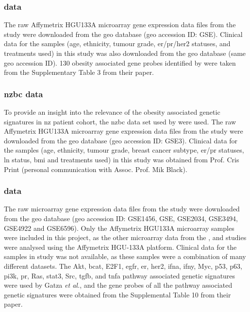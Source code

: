 \subsubsection{\citet{Fuentes-Mattei2014} data}
\label{ssub:fuentes-mattei2014_data}

The raw Affymetrix HGU\-133A microarray gene expression data files from the  \citet{Fuentes-Mattei2014} study were downloaded from the \gls{geo} database (\gls{geo} accession ID: GSE).
Clinical data for the samples (age, ethnicity, tumour grade, \gls{er}/\gls{pr}/\gls{her2} statuses, and treatments used) in this study was also downloaded from the \gls{geo} database (same \gls{geo} accession ID).
130 obesity associated gene probes identified by \citet{Fuentes-Mattei2014} were taken from the Supplementary Table 3 from their paper.

\subsubsection{\gls{nzbc} data}
\label{ssub:nzbc_data}

To provide an insight into the relevance of the obesity associated genetic signatures in \gls{nz} patient cohort, the \gls{nzbc} data set used by \citet{Print2016} were used.
The raw Affymetrix HGU133A microarray gene expression data files from the \citet{Print2016} study were downloaded from the \gls{geo} database (\gls{geo} accession ID: GSE3).
Clinical data for the samples (age, ethnicity, tumour grade, breast cancer subtype, \gls{er}/\gls{pr} statuses, \gls{ln} status, \gls{bmi} and treatments used) in this study was obtained from Prof. Cris Print (personal communication with Assoc. Prof. Mik Black).

\subsubsection{\citet{Gatza2010a} data}
\label{ssub:gatza2010a_data}

The raw microarray gene expression data files from the \citet{Gatza2010a} study were downloaded from the \gls{geo} database (\gls{geo} accession ID: GSE1456, GSE, GSE2034, GSE3494, GSE4922 and GSE6596).
Only the Affymetrix HGU\-133A microarray samples were included in this project, as the other microarray data from the \citet{Creighton2012}, \citet{Fuentes-Mattei2014} and \citet{Print2016} studies were analysed using the Affymetrix HGU-133A platform.
Clinical data for the samples in \citet{Gatza2010a} study was not available, as these samples were a combination of many different datasets.
The Akt, \gls{bcat}, E2F1, \gls{egfr}, \gls{er}, \gls{her2}, \gls{ifna}, \gls{ifny}, Myc, p53, p63, \gls{pi3k}, \gls{pr}, Ras, \gls{stat3}, Src, \gls{tgfb}, and \gls{tnfa} pathway associated genetic signatures were used by Gatza \textit{et al.}, and the gene probes of all the pathway associated genetic signatures were obtained from the Supplemental Table 10 from their paper.


